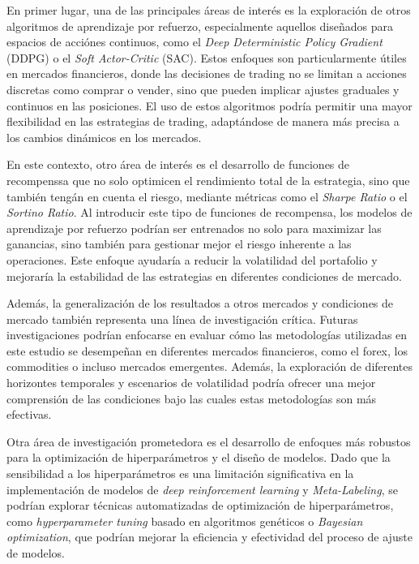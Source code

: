 \documentclass[a4paper,12pt, twoside]{report}
\begin{document}

En primer lugar, una de las principales áreas de interés es la exploración de otros algoritmos de 
aprendizaje por refuerzo, especialmente aquellos diseñados para espacios de acciónes continuos, como el 
\textit{Deep Deterministic Policy Gradient} (DDPG) o el \textit{Soft Actor-Critic} (SAC). Estos enfoques 
son particularmente útiles en mercados financieros, donde las decisiones de trading no se limitan a acciones 
discretas como comprar o vender, sino que pueden implicar ajustes graduales y continuos en las posiciones. 
El uso de estos algoritmos podría permitir una mayor flexibilidad en las estrategias de trading, adaptándose 
de manera más precisa a los cambios dinámicos en los mercados.

En este contexto, otro área de interés es el desarrollo de funciones de recompenssa 
que no solo optimicen el rendimiento total de la estrategia, sino que también tengán en cuenta el riesgo, 
mediante métricas como el \textit{Sharpe Ratio} o el \textit{Sortino Ratio}. Al introducir este tipo de 
funciones de recompensa, los modelos de aprendizaje por refuerzo podrían ser entrenados no solo para 
maximizar las ganancias, sino también para gestionar mejor el riesgo inherente a las operaciones. Este 
enfoque ayudaría a reducir la volatilidad del portafolio y mejoraría la estabilidad de las estrategias 
en diferentes condiciones de mercado.

Además, la generalización de los resultados a otros mercados y condiciones de mercado también 
representa una línea de investigación crítica. Futuras investigaciones podrían enfocarse 
en evaluar cómo las metodologías utilizadas en este estudio se desempeñan en diferentes 
mercados financieros, como el forex, los commodities o incluso mercados emergentes. Además, 
la exploración de diferentes horizontes temporales y escenarios de volatilidad podría 
ofrecer una mejor comprensión de las condiciones bajo las cuales estas metodologías son 
más efectivas.


Otra área de investigación prometedora es el desarrollo de enfoques más robustos para 
la optimización de hiperparámetros y el diseño de modelos. Dado que la sensibilidad a 
los hiperparámetros es una limitación significativa en la implementación de modelos de 
\textit{deep reinforcement learning} y \textit{Meta-Labeling}, se podrían explorar 
técnicas automatizadas de optimización de hiperparámetros, como \textit{hyperparameter tuning} 
basado en algoritmos genéticos o \textit{Bayesian optimization}, que podrían mejorar la 
eficiencia y efectividad del proceso de ajuste de modelos.
\end{document}
